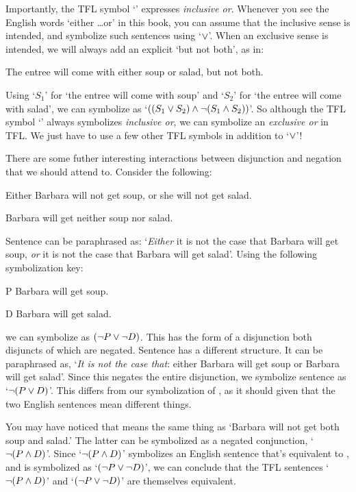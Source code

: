 Importantly, the TFL symbol `\eor' expresses \emph{inclusive or}.  Whenever you see the English words `either \ldots or' in this book, you can assume that the inclusive sense is intended, and symbolize such sentences using `$\vee$'.  When an exclusive sense is  intended, we will always add an explicit `but not both', as in:
	\begin{earg}
		\item[\ex{or.xor}] The entree will come with either soup or salad, but not both.
	\end{earg}
Using `$S_1$' for `the entree will come with soup' and `$S_2$' for `the entree will come with salad', we can symbolize  as `$((S_1 \vee S_2) \wedge \neg (S_1 \wedge S_2))$'.  So although the TFL symbol `\eor' always symbolizes \emph{inclusive or}, we can symbolize an \emph{exclusive or} in {TFL}. We just have to use a few other TFL symbols in addition to `$\vee$'!


There are some futher interesting interactions between disjunction and negation that we should attend to. Consider the following:

	\begin{earg}
		\item[\ex{or3}] Either Barbara will not get soup, or she will not get salad.
		\item[\ex{or4}] Barbara will get neither soup nor salad.
	\end{earg}
Sentence  can be paraphrased as: `\emph{Either} it is not the case that Barbara will get soup, \emph{or} it is not the case that Barbara will get salad'.  Using the following symbolization key:

	\begin{ekey}
		\item[P] Barbara will get soup.
		\item[D] Barbara will get salad.
	\end{ekey}
we can symbolize  as $(\neg P \vee \neg D)$.  This has the form of a disjunction both disjuncts of which are negated.  Sentence  has a different structure. It can be paraphrased as, `\emph{It is not the case that}: either Barbara will get soup or Barbara will get salad'. Since this negates the entire disjunction, we symbolize sentence  as `$\neg (P \vee D)$'.  This differs from our symbolization of , as it should given that the two English sentences mean different things.

You may have noticed that  means the same thing as `Barbara will not get both soup and salad.'  The latter can be symbolized as a negated conjunction, `$\neg(P \wedge D)$'.  Since `$\neg(P \wedge D)$' symbolizes an English sentence that's equivalent to , and  is symbolized as `$(\neg P \vee \neg D)$', we can conclude that the TFL sentences `$\neg(P \wedge D)$'  and `$(\neg P \vee \neg D)$' are themselves equivalent.

